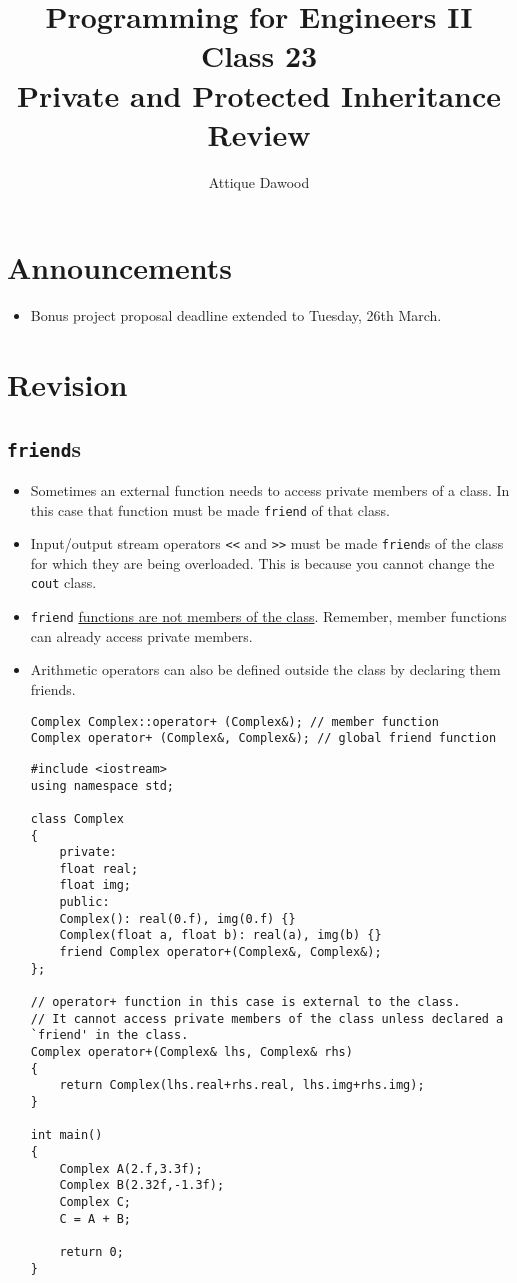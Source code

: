 \documentclass[12pt,a4paper]{article}
\title{\vspace{-2cm}Programming for Engineers II\\Class 23\\Private and Protected Inheritance\\Review}
\author{Attique Dawood}
\begin{document}
\maketitle
\section{Announcements}
\begin{itemize}
\item Bonus project proposal deadline extended to Tuesday, 26th March.
\end{itemize}
\section{Revision}
\subsection{\texttt{friend}s}
\begin{itemize}
\item Sometimes an external function needs to access private members of a class. In this case that function must be made \verb|friend| of that class.
\item Input/output stream operators \verb|<<| and \verb|>>| must be made \verb|friend|s of the class for which they are being overloaded. This is because you cannot change the \verb|cout| class.
\item \verb|friend| \underline{functions are not members of the class}. Remember, member functions can already access private members.
\item Arithmetic operators can also be defined outside the class by declaring them friends.
\begin{lstlisting}[caption={operator+ prototype as member function and as \texttt{friend}}]
Complex Complex::operator+ (Complex&); // member function
Complex operator+ (Complex&, Complex&); // global friend function
\end{lstlisting}
\begin{lstlisting}[caption={operator+ implemented as \texttt{friend}}]
#include <iostream>
using namespace std;

class Complex
{
	private:
	float real;
	float img;
	public:
	Complex(): real(0.f), img(0.f) {}
	Complex(float a, float b): real(a), img(b) {}
	friend Complex operator+(Complex&, Complex&);
};

// operator+ function in this case is external to the class.
// It cannot access private members of the class unless declared a `friend' in the class.
Complex operator+(Complex& lhs, Complex& rhs)
{
	return Complex(lhs.real+rhs.real, lhs.img+rhs.img);
}

int main()
{
	Complex A(2.f,3.3f);
	Complex B(2.32f,-1.3f);
	Complex C;
	C = A + B;

	return 0;
}
\end{lstlisting}
\end{itemize}
\end{document}
